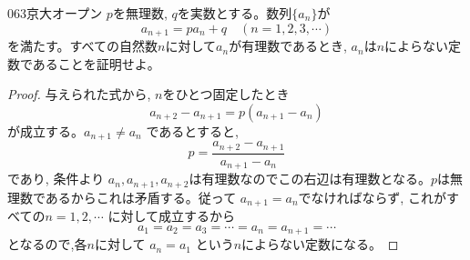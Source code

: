 \begin{prob}{063}{}{京大オープン}
 $p$を無理数, $q$を実数とする。数列$\{a_n\}$が
\[a_{n+1}=pa_n+q \quad (n=1,2,3,\cdots)\]
を満たす。すべての自然数$n$に対して$a_n$が有理数であるとき, $a_n$は$n$によらない定数であることを証明せよ。
\end{prob}
\begin{proof}
与えられた式から, $n$をひとつ固定したとき
\[ a_{n+2}-a_{n+1}=p(a_{n+1}-a_n) \]
が成立する。$a_{n+1}\neq a_n$ であるとすると, 
\[p=\dfrac{a_{n+2}-a_{n+1}}{a_{n+1}-a_{n}}\]
であり, 条件より $a_n, a_{n+1}, a_{n+2}$は有理数なのでこの右辺は有理数となる。$p$は無理数であるからこれは矛盾する。従って $a_{n+1}=a_n$でなければならず, これがすべての$n=1,2,\cdots$ に対して成立するから
\[a_1=a_2=a_3=\cdots =a_n=a_{n+1}=\cdots \]
となるので,各$n$に対して $a_n=a_1$ という$n$によらない定数になる。
\end{proof}
